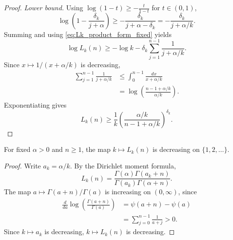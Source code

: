 \begin{proof}
\emph{Lower bound.}
Using $\log(1-t)\ge -\frac{t}{1-t}$ for $t\in(0,1)$,
\[
\log\!\left(1-\frac{\delta_k}{j+\alpha}\right)
\ge -\frac{\delta_k}{j+\alpha-\delta_k}
=-\frac{\delta_k}{j+\alpha/k}.
\]
Summing and using \eqref{eq:Lk_product_form_fixed} yields
\[
\log L_k(n)\ge -\log k-\delta_k\sum_{j=1}^{n-1}\frac{1}{j+\alpha/k}.
\]
Since $x\mapsto 1/(x+\alpha/k)$ is decreasing,
\[
\begin{aligned}
\sum_{j=1}^{n-1}\frac{1}{j+\alpha/k}
&\le \int_{0}^{n-1}\frac{dx}{x+\alpha/k}\\
&=\log\!\left(\frac{n-1+\alpha/k}{\alpha/k}\right).
\end{aligned}
\]
Exponentiating gives
\[
L_k(n)\ge \frac1k\left(\frac{\alpha/k}{n-1+\alpha/k}\right)^{\delta_k}.
\]
\end{proof}

\begin{lemma}[Monotonicity of $L_k(n)$]\label{lem:Lk_monotone_fixed}
For fixed $\alpha>0$ and $n\ge 1$, the map $k\mapsto L_k(n)$ is decreasing on
$\{1,2,\dots\}$.
\end{lemma}
\begin{proof}
Write $a_k=\alpha/k$. By the Dirichlet moment formula,
\[
L_k(n)=\frac{\Gamma(\alpha)\Gamma(a_k+n)}{\Gamma(a_k)\Gamma(\alpha+n)}.
\]
The map $a\mapsto \Gamma(a+n)/\Gamma(a)$ is increasing on $(0,\infty)$, since
\[
\begin{aligned}
\frac{d}{da}\log\!\left(\frac{\Gamma(a+n)}{\Gamma(a)}\right)
&=\psi(a+n)-\psi(a)\\
&=\sum_{j=0}^{n-1}\frac{1}{a+j}>0.
\end{aligned}
\]
Since $k\mapsto a_k$ is decreasing, $k\mapsto L_k(n)$ is decreasing.
\end{proof}

